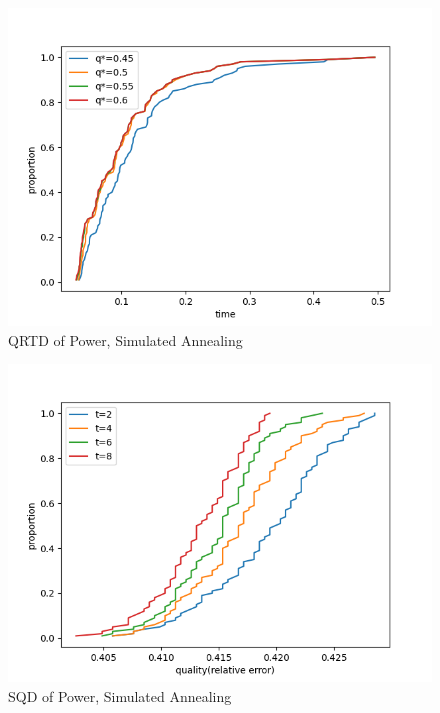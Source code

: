 \documentclass[acmlarge]{acmart}
\begin{document}
\begin{figure}[h]
	\includegraphics[width=\linewidth]{power_QRTD_LS1.png}
	\caption{QRTD of Power, Simulated Annealing}
\end{figure}


\begin{figure}[h]
	\includegraphics[width=\linewidth]{power_SQD_LS1.png}
	\caption{SQD of Power, Simulated Annealing}
\end{figure}
\end{document}
